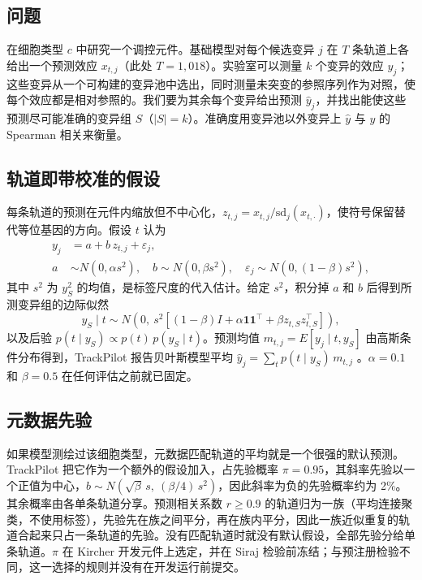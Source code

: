 \documentclass[webpdf,contemporary,large]{oup-authoring-template}
\newcommand{\tp}{TrackPilot}
\begin{document}
\subsection{问题}

在细胞类型 $c$ 中研究一个调控元件。基础模型对每个候选变异 $j$ 在 $T$ 条轨道上各给出一个预测效应 $x_{t,j}$（此处 $T = 1{,}018$）。实验室可以测量 $k$ 个变异的效应 $y_j$；这些变异从一个可构建的变异池中选出，同时测量未突变的参照序列作为对照，使每个效应都是相对参照的。我们要为其余每个变异给出预测 $\hat y_j$，并找出能使这些预测尽可能准确的变异组 $S$（$|S| = k$）。准确度用变异池以外变异上 $\hat y$ 与 $y$ 的 Spearman 相关来衡量。

\subsection{轨道即带校准的假设}

每条轨道的预测在元件内缩放但不中心化，$z_{t,j} = x_{t,j}/\mathrm{sd}_j(x_{t,\cdot})$，使符号保留替代等位基因的方向。假设 $t$ 认为
\begin{equation}
\begin{aligned}
y_j &= a + b\,z_{t,j} + \varepsilon_j,\\
a &\sim N(0,\alpha s^2),\quad b \sim N(0,\beta s^2),\quad \varepsilon_j \sim N(0,(1-\beta)s^2),
\end{aligned}
\end{equation}
其中 $s^2$ 为 $y_S^2$ 的均值，是标签尺度的代入估计。给定 $s^2$，积分掉 $a$ 和 $b$ 后得到所测变异组的边际似然
\begin{equation}
y_S \mid t \sim N\!\left(0,\ s^2\left[(1-\beta)I + \alpha \mathbf{1}\mathbf{1}^\top + \beta z_{t,S} z_{t,S}^\top\right]\right),
\end{equation}
以及后验 $p(t \mid y_S) \propto p(t)\,p(y_S \mid t)$。预测均值 $m_{t,j} = E[y_j \mid t, y_S]$ 由高斯条件分布得到，\tp{} 报告贝叶斯模型平均 $\hat y_j = \sum_t p(t\mid y_S)\,m_{t,j}$ \citep{hoeting1999bma}。$\alpha = 0.1$ 和 $\beta = 0.5$ 在任何评估之前就已固定。

\subsection{元数据先验}

如果模型测绘过该细胞类型，元数据匹配轨道的平均就是一个很强的默认预测。\tp{} 把它作为一个额外的假设加入，占先验概率 $\pi = 0.95$，其斜率先验以一个正值为中心，$b \sim N(\sqrt{\beta}\,s,\ (\beta/4)\,s^2)$，因此斜率为负的先验概率约为 2\%。其余概率由各单条轨道分享。预测相关系数 $r \ge 0.9$ 的轨道归为一族（平均连接聚类，不使用标签），先验先在族之间平分，再在族内平分，因此一族近似重复的轨道合起来只占一条轨道的先验。没有匹配轨道时就没有默认假设，全部先验分给单条轨道。$\pi$ 在 Kircher 开发元件上选定，并在 Siraj 检验前冻结；与预注册检验不同，这一选择的规则并没有在开发运行前提交。
\end{document}
